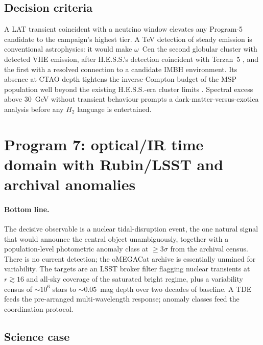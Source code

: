 \documentclass[11pt]{article}
\newcommand{\ocen}{\ensuremath{\omega}~Cen}
\begin{document}
\subsection{Decision criteria}

A LAT transient coincident with a neutrino window elevates any Program-5 candidate to the campaign's highest tier. A TeV detection of steady emission is conventional astrophysics: it would make \ocen{} the second globular cluster with detected VHE emission, after H.E.S.S.'s detection coincident with Terzan~5 \citep{Abramowski2011}, and the first with a resolved connection to a candidate IMBH environment. Its absence at CTAO depth tightens the inverse-Compton budget of the MSP population well beyond the existing H.E.S.S.-era cluster limits \citep{HESS2013}. Spectral excess above 30~GeV without transient behaviour prompts a dark-matter-versus-exotica analysis before any $H_2$ language is entertained.

\section{Program 7: optical/IR time domain with Rubin/LSST and archival anomalies}
\label{sec:timedomain}

\paragraph{Bottom line.} The decisive observable is a nuclear tidal-disruption event, the one natural signal that would announce the central object unambiguously, together with a population-level photometric anomaly class at $\geq3\sigma$ from the archival census. There is no current detection; the oMEGACat archive is essentially unmined for variability. The targets are an LSST broker filter flagging nuclear transients at $r \gtrsim 16$ and all-sky coverage of the saturated bright regime, plus a variability census of $\sim10^{6}$ stars to $\sim0.05$~mag depth over two decades of baseline. A TDE feeds the pre-arranged multi-wavelength response; anomaly classes feed the coordination protocol.

\subsection{Science case}
\end{document}
